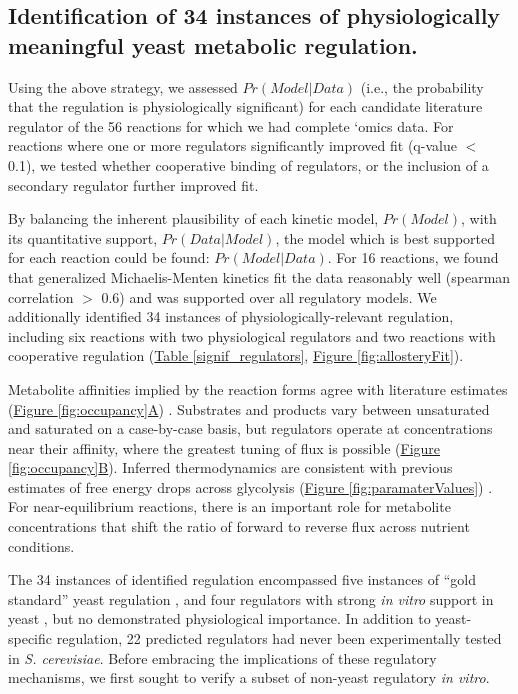\subsection{Identification of 34 instances of physiologically meaningful yeast metabolic regulation.}

Using the above strategy, we assessed $Pr(Model | Data)$ (i.e., the probability that the regulation is physiologically significant) for each candidate literature regulator of the 56 reactions for which we had complete `omics data. For reactions where one or more regulators significantly improved fit (q-value $<$ 0.1), we tested whether cooperative binding of regulators, or the inclusion of a secondary regulator further improved fit.

By balancing the inherent plausibility of each kinetic model, $Pr(Model)$, with its quantitative support, $Pr(Data | Model)$, the model which is best supported for each reaction could be found: $Pr(Model | Data)$. For 16 reactions, we found that generalized Michaelis-Menten kinetics fit the data reasonably well (spearman correlation $>$ 0.6) and was supported over all regulatory models. We additionally identified 34 instances of physiologically-relevant regulation, including six reactions with two physiological regulators and two reactions with cooperative regulation (\hyperref[signif_regulators]{Table \ref{signif_regulators}}, \hyperref[fig:allosteryFit]{Figure \ref{fig:allosteryFit}}). 

Metabolite affinities implied by the reaction forms agree with literature estimates (\hyperref[fig:occupancy]{Figure \ref{fig:occupancy}A}) \cite{Scheer:2011df}. Substrates and products vary between unsaturated and saturated on a case-by-case basis, but regulators operate at concentrations near their affinity, where the greatest tuning of flux is possible (\hyperref[fig:occupancy]{Figure \ref{fig:occupancy}B}). Inferred thermodynamics are consistent with previous estimates of free energy drops across glycolysis (\hyperref[fig:paramaterValues]{Figure \ref{fig:paramaterValues}}) \cite{Flamholz:2013io}. For near-equilibrium reactions, there is an important role for metabolite concentrations that shift the ratio of forward to reverse flux across nutrient conditions.

The 34 instances of identified regulation encompassed five instances of ``gold standard'' yeast regulation \cite{Jones:1982dn, Sekine:2007ej, Fraenkel:2011wp}, and four regulators with strong \textit{in vitro} support in yeast \cite{Li:1996vg, Khoo:1970wt, Majtan:2014jp, VANDERCAMMEN:1989er}, but no demonstrated physiological importance. In addition to yeast-specific regulation, 22 predicted regulators had never been experimentally tested in \textit{S. cerevisiae}. Before embracing the implications of these regulatory mechanisms, we first sought to verify a subset of non-yeast regulatory \textit{in vitro}.

